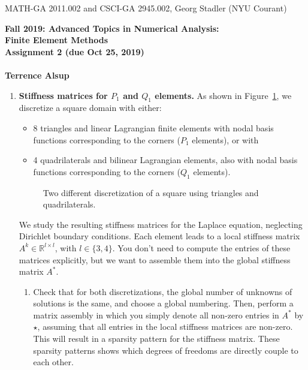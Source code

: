 \documentclass[11pt]{article}
\begin{document}
\begin{center}
  \vspace*{-2cm}
{\small MATH-GA 2011.002 and CSCI-GA 2945.002, Georg Stadler (NYU Courant)}
\end{center}
\vspace*{.5cm}
\begin{center}
\large \textbf{%
Fall 2019: Advanced Topics in Numerical Analysis: \\
Finite Element Methods \\
Assignment 2 (due Oct 25, 2019) \\
\\
Terrence Alsup}
\end{center}


\begin{enumerate}
\item  {\bf Stiffness matrices for $P_1$ and $Q_1$ elements.}
  As shown in Figure~\ref{fig1}, we discretize a square domain with
  either:
  \begin{itemize}
  \item 8 triangles and linear Lagrangian finite elements with nodal basis functions
    corresponding to the corners ($P_1$ elements), or with
  \item  4 quadrilaterals and bilinear Lagrangian elements, also with
    nodal basis functions corresponding to the corners ($Q_1$ elements).
  \end{itemize}
%
\begin{figure}[h!]\centering
{}
\caption{Two different discretization of a square using triangles and
  quadrilaterals.\label{fig1}}
\end{figure}
We study the resulting stiffness matrices for the Laplace
equation, neglecting Dirichlet boundary conditions. Each element leads
to a local stiffness matrix $A^k\in \mathbb R^{l\times l}$, with $l\in
\{3,4\}$. You don't need to compute the entries of these matrices
explicitly, but we want to assemble them into the global stiffness
matrix $A^*$.
\begin{enumerate}
  \item Check that for both discretizations, the global number of
    unknowns of solutions is the same, and choose a global numbering.
    Then, perform a matrix assembly in which you simply denote all
    non-zero entries in $A^*$ by $\star$, assuming that all entries in
    the local stiffness matrices are non-zero. This will result in a
    sparsity pattern for the stiffness matrix. These sparsity patterns
    shows which degrees of freedoms are directly couple to each other.\\
\\


\end{enumerate}
\end{enumerate}
\end{document}
